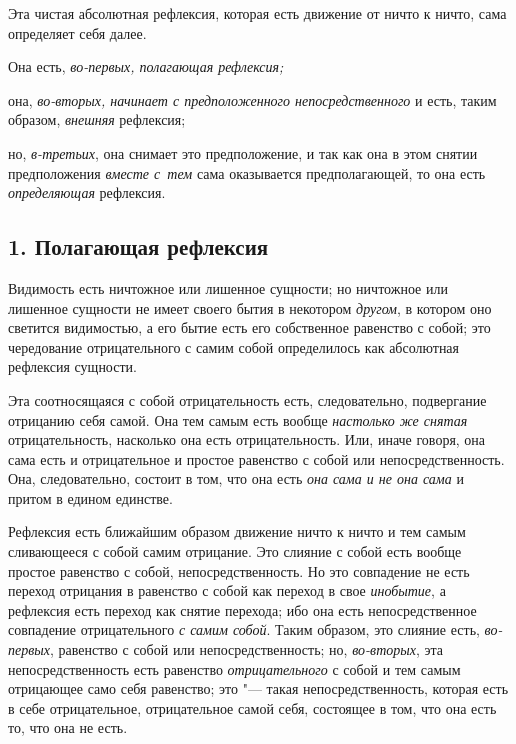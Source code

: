 Эта чистая абсолютная рефлексия, которая есть движение от ничто к ничто,
сама определяет себя далее.

Она есть, {\em во-первых, полагающая рефлексия;}

она, {\em во-вторых, начинает с предположенного непосредственного} и есть,
таким образом, {\em внешняя} рефлексия;

но, {\em в-третьих}, она снимает это предположение, и
так как она в этом снятии предположения {\em вместе с~тем}
сама оказывается предполагающей, то она есть {\em определяющая} рефлексия.

\subsection[1. Полагающая рефлексия]{1. Полагающая рефлексия}
Видимость есть ничтожное или лишенное сущности;
но ничтожное или лишенное сущности не имеет своего бытия в некотором
{\em другом}, в котором оно светится видимостью, а его
бытие есть его собственное равенство с собой; это чередование
отрицательного с самим собой определилось как абсолютная рефлексия сущности.

Эта соотносящаяся с собой отрицательность есть, следовательно, подвергание
отрицанию себя самой. Она тем самым есть вообще
{\em настолько же снятая} отрицательность, насколько
она есть отрицательность. Или, иначе говоря, она сама есть и отрицательное
и простое равенство с собой или непосредственность. Она, следовательно,
состоит в том, что она есть {\em она сама и не она
сама} и притом в едином единстве.

Рефлексия есть ближайшим образом движение ничто к ничто и тем самым
сливающееся с собой самим отрицание. Это слияние с собой есть вообще
простое равенство с собой, непосредственность. Но это совпадение не есть
переход отрицания в равенство с собой как переход в свое
{\em инобытие}, а рефлексия есть переход как снятие
перехода; ибо она есть непосредственное совпадение отрицательного
{\em с самим собой}. Таким образом, это слияние есть,
{\em во-первых}, равенство с собой или
непосредственность; но, {\em во-вторых}, эта
непосредственность есть равенство {\em отрицательного}
с собой и тем самым отрицающее само себя равенство; это "--- такая
непосредственность, которая есть в себе отрицательное, отрицательное самой
себя, состоящее в том, что она есть то, что она не есть.


